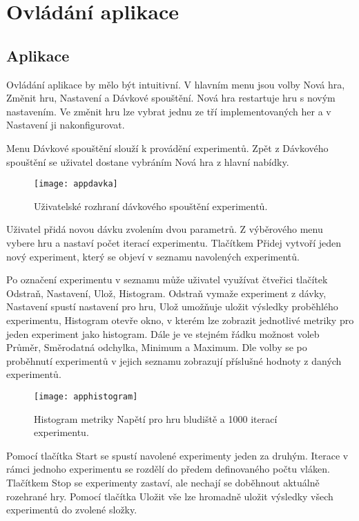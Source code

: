 \chapter{Ovládání aplikace}

\section{Aplikace}

Ovládání aplikace by mělo být intuitivní. V hlavním menu jsou volby Nová hra, Změnit hru, Nastavení a Dávkové spouštění. Nová hra restartuje hru s novým nastavením. Ve změnit hru lze vybrat jednu ze tří implementovaných her a v Nastavení ji nakonfigurovat.

Menu Dávkové spouštění slouží k provádění experimentů. Zpět z Dávkového spouštění se uživatel dostane vybráním Nová hra z hlavní nabídky.


\begin{figure}
  \centering
  \texttt{[image: appdavka]}
	\caption{Uživatelské rozhraní dávkového spouštění experimentů. }
	\label{fig-appdavka}
\end{figure}

Uživatel přidá novou dávku zvolením dvou parametrů. Z výběrového menu vybere hru a nastaví počet iterací experimentu. Tlačítkem Přidej vytvoří jeden nový experiment, který se objeví v seznamu navolených experimentů. 

Po označení experimentu v seznamu může uživatel využívat čtveřici tlačítek Odstraň, Nastavení, Ulož, Histogram. Odstraň vymaže experiment z dávky, Nastavení spustí nastavení pro hru, Ulož umožňuje uložit výsledky proběhlého experimentu, Histogram otevře okno, v kterém lze zobrazit jednotlivé metriky pro jeden experiment jako histogram. Dále je ve stejném řádku možnost voleb Průměr, Směrodatná odchylka, Minimum a Maximum. Dle volby se po proběhnutí experimentů v jejich seznamu zobrazují příslušné hodnoty z daných experimentů. 


\begin{figure}
  \centering
  \texttt{[image: apphistogram]}
	\caption{Histogram metriky Napětí pro hru bludiště a 1000 iterací experimentu. }
	\label{fig-apphistogram}
\end{figure}

Pomocí tlačítka Start se spustí navolené experimenty jeden za druhým. Iterace v rámci jednoho experimentu se rozdělí do předem definovaného počtu vláken. Tlačítkem Stop se experimenty zastaví, ale nechají se doběhnout aktuálně rozehrané hry. Pomocí tlačítka Uložit vše lze hromadně uložit výsledky všech experimentů do zvolené složky. 

